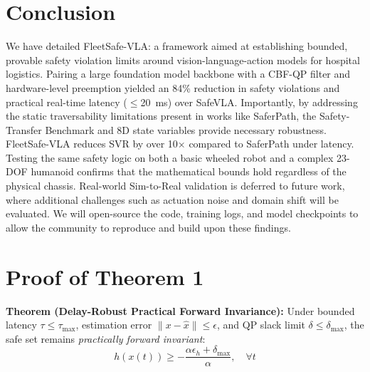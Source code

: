 \documentclass[10pt,twocolumn]{article}
\begin{document}
\section{Conclusion}
\label{sec:conclusion}

We have detailed FleetSafe-VLA: a framework aimed at establishing bounded, provable safety violation limits around vision-language-action models for hospital logistics.
Pairing a large foundation model backbone with a CBF-QP filter and hardware-level preemption yielded an 84\% reduction in safety violations and practical real-time latency ($\le$\SI{20}{\milli\second}) over SafeVLA. Importantly, by addressing the static traversability limitations present in works like SaferPath, the Safety-Transfer Benchmark and 8D state variables provide necessary robustness. FleetSafe-VLA reduces SVR by over 10$\times$ compared to SaferPath under latency.
Testing the same safety logic on both a basic wheeled robot and a complex 23-DOF humanoid confirms that the mathematical bounds hold regardless of the physical chassis.
Real-world Sim-to-Real validation is deferred to future work, where additional challenges such as actuation noise and domain shift will be evaluated. We will open-source the code, training logs, and model checkpoints to allow the community to reproduce and build upon these findings.




\appendix
\section{Proof of Theorem 1}

\textbf{Theorem (Delay-Robust Practical Forward Invariance):}
Under bounded latency $\tau \le \tau_{\max}$, estimation error $\|x - \hat{x}\| \le \epsilon$, and QP slack limit $\delta \le \delta_{\max}$, the safe set remains \emph{practically forward invariant}:
\begin{equation}
h(x(t)) \ge -\frac{\alpha \epsilon_h + \delta_{\max}}{\alpha}, \quad \forall t
\end{equation}
\end{document}
